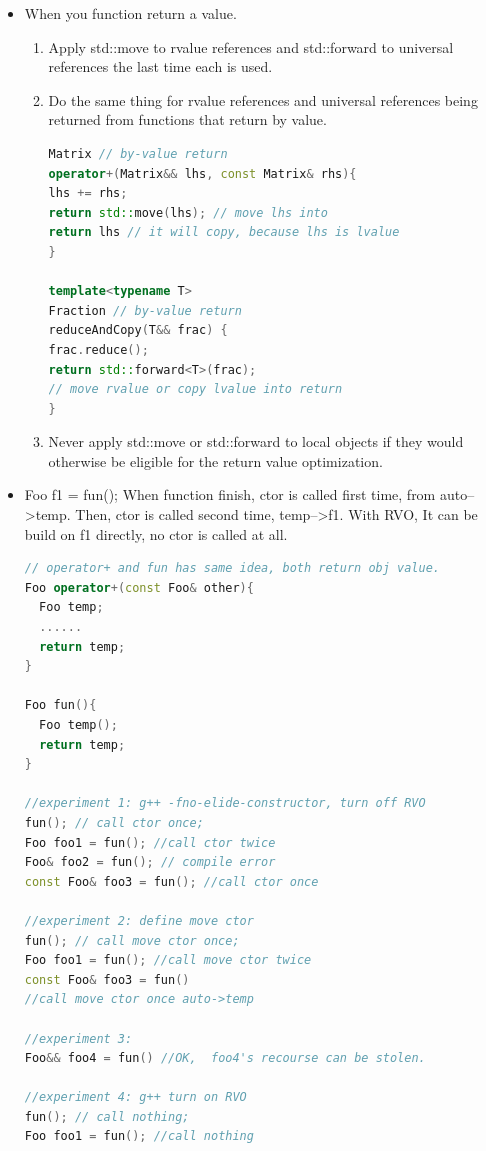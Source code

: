 \documentclass[a4paper,12pt,twoside]{book}
\begin{document}
\begin{itemize}

\item When you function return a value.
\begin{enumerate}
\item Apply std::move to rvalue references and std::forward to universal references
the last time each is used.

\item Do the same thing for rvalue references and universal references being
returned from functions that return by value.
\begin{lstlisting}[frame=single, language=c++]
Matrix // by-value return
operator+(Matrix&& lhs, const Matrix& rhs){
lhs += rhs;
return std::move(lhs); // move lhs into
return lhs // it will copy, because lhs is lvalue
}

template<typename T>
Fraction // by-value return
reduceAndCopy(T&& frac) {
frac.reduce();
return std::forward<T>(frac);
// move rvalue or copy lvalue into return
}
\end{lstlisting}
\item Never apply std::move or std::forward to local objects if they would otherwise
be eligible for the return value optimization.
\end{enumerate}

\item Foo f1 = fun(); When function finish, ctor is called first time, from auto-->temp. Then, ctor is called  second time,  temp-->f1. With RVO, It can be build on f1 directly, no ctor is called at all.
\begin{lstlisting}[frame=single, language=c++]
// operator+ and fun has same idea, both return obj value.
Foo operator+(const Foo& other){
  Foo temp;
  ......
  return temp;
}

Foo fun(){
  Foo temp();
  return temp;
}

//experiment 1: g++ -fno-elide-constructor, turn off RVO
fun(); // call ctor once;
Foo foo1 = fun(); //call ctor twice
Foo& foo2 = fun(); // compile error
const Foo& foo3 = fun(); //call ctor once

//experiment 2: define move ctor
fun(); // call move ctor once;
Foo foo1 = fun(); //call move ctor twice
const Foo& foo3 = fun()
//call move ctor once auto->temp

//experiment 3:
Foo&& foo4 = fun() //OK,  foo4's recourse can be stolen.

//experiment 4: g++ turn on RVO
fun(); // call nothing;
Foo foo1 = fun(); //call nothing
\end{lstlisting}



\end{itemize}
\end{document}
